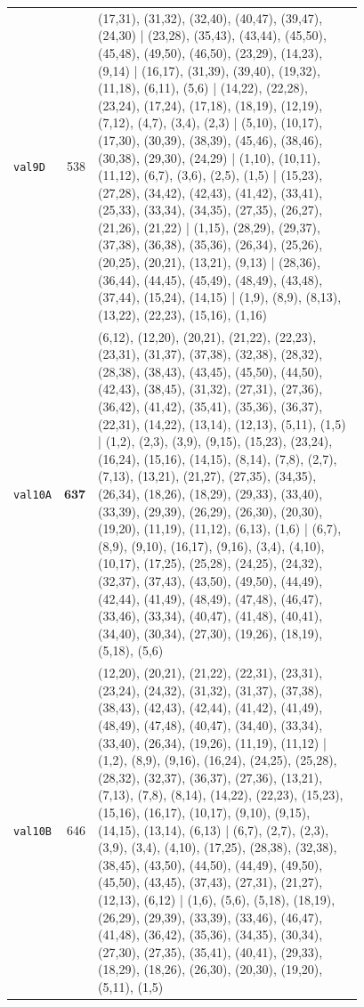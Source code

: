 \begin{landscape}
\begin{longtable}{lr>{\tiny\raggedright\arraybackslash}p{0.78\linewidth}}
\texttt{val9D} & 538 & (17,31), (31,32), (32,40), (40,47), (39,47), (24,30) | (23,28), (35,43), (43,44), (45,50), (45,48), (49,50), (46,50), (23,29), (14,23), (9,14) | (16,17), (31,39), (39,40), (19,32), (11,18), (6,11), (5,6) | (14,22), (22,28), (23,24), (17,24), (17,18), (18,19), (12,19), (7,12), (4,7), (3,4), (2,3) | (5,10), (10,17), (17,30), (30,39), (38,39), (45,46), (38,46), (30,38), (29,30), (24,29) | (1,10), (10,11), (11,12), (6,7), (3,6), (2,5), (1,5) | (15,23), (27,28), (34,42), (42,43), (41,42), (33,41), (25,33), (33,34), (34,35), (27,35), (26,27), (21,26), (21,22) | (1,15), (28,29), (29,37), (37,38), (36,38), (35,36), (26,34), (25,26), (20,25), (20,21), (13,21), (9,13) | (28,36), (36,44), (44,45), (45,49), (48,49), (43,48), (37,44), (15,24), (14,15) | (1,9), (8,9), (8,13), (13,22), (22,23), (15,16), (1,16) \\[2pt]
\texttt{val10A} & $\mathbf{637}$ & (6,12), (12,20), (20,21), (21,22), (22,23), (23,31), (31,37), (37,38), (32,38), (28,32), (28,38), (38,43), (43,45), (45,50), (44,50), (42,43), (38,45), (31,32), (27,31), (27,36), (36,42), (41,42), (35,41), (35,36), (36,37), (22,31), (14,22), (13,14), (12,13), (5,11), (1,5) | (1,2), (2,3), (3,9), (9,15), (15,23), (23,24), (16,24), (15,16), (14,15), (8,14), (7,8), (2,7), (7,13), (13,21), (21,27), (27,35), (34,35), (26,34), (18,26), (18,29), (29,33), (33,40), (33,39), (29,39), (26,29), (26,30), (20,30), (19,20), (11,19), (11,12), (6,13), (1,6) | (6,7), (8,9), (9,10), (16,17), (9,16), (3,4), (4,10), (10,17), (17,25), (25,28), (24,25), (24,32), (32,37), (37,43), (43,50), (49,50), (44,49), (42,44), (41,49), (48,49), (47,48), (46,47), (33,46), (33,34), (40,47), (41,48), (40,41), (34,40), (30,34), (27,30), (19,26), (18,19), (5,18), (5,6) \\[2pt]
\texttt{val10B} & 646 & (12,20), (20,21), (21,22), (22,31), (23,31), (23,24), (24,32), (31,32), (31,37), (37,38), (38,43), (42,43), (42,44), (41,42), (41,49), (48,49), (47,48), (40,47), (34,40), (33,34), (33,40), (26,34), (19,26), (11,19), (11,12) | (1,2), (8,9), (9,16), (16,24), (24,25), (25,28), (28,32), (32,37), (36,37), (27,36), (13,21), (7,13), (7,8), (8,14), (14,22), (22,23), (15,23), (15,16), (16,17), (10,17), (9,10), (9,15), (14,15), (13,14), (6,13) | (6,7), (2,7), (2,3), (3,9), (3,4), (4,10), (17,25), (28,38), (32,38), (38,45), (43,50), (44,50), (44,49), (49,50), (45,50), (43,45), (37,43), (27,31), (21,27), (12,13), (6,12) | (1,6), (5,6), (5,18), (18,19), (26,29), (29,39), (33,39), (33,46), (46,47), (41,48), (36,42), (35,36), (34,35), (30,34), (27,30), (27,35), (35,41), (40,41), (29,33), (18,29), (18,26), (26,30), (20,30), (19,20), (5,11), (1,5) \\[2pt]

\end{longtable}
\end{landscape}
